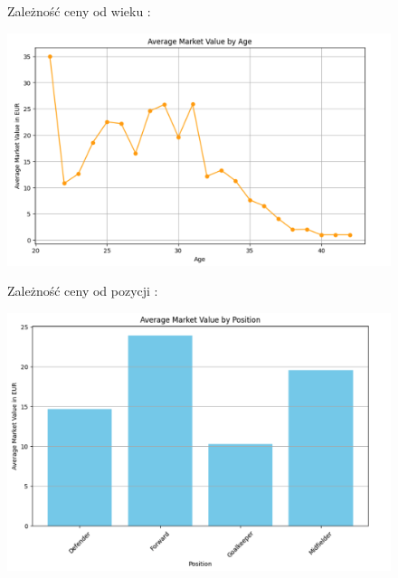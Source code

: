 \documentclass{article}
\begin{document}
\begin{figure}[H]
    \centering
        \begin{minipage}{0.5\textwidth} 
        \centering Zależność ceny od wieku :
    \end{minipage}
    \begin{minipage}{1\textwidth} 
        \includegraphics[width=\linewidth]{age.png} 
        \label{fig:zdjecie}
    \end{minipage}
    \hfill 

\end{figure}

\begin{figure}[H]
    \centering
        \begin{minipage}{0.5\textwidth} 
        \centering Zależność ceny od pozycji :
    \end{minipage}
    \begin{minipage}{1\textwidth} 
        \includegraphics[width=\linewidth]{position.png} 
        \label{fig:zdjecie}
    \end{minipage}
    \hfill 

\end{figure}
\end{document}

